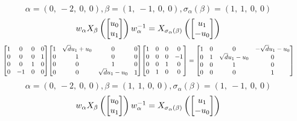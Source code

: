 \documentclass[11pt]{article}
\theoremstyle{definition}
\begin{document}
\[
\alpha = \left( 0, \  -2, \  0, \  0\right), \beta = \left( 1, \  -1, \  0, \  0\right), \sigma_{\alpha}(\beta) = \left( 1, \  1, \  0, \  0\right)
\]
\[
\scaletoalign{\textwidth}{w_{\alpha} X_{\beta}\left(\left[\begin{matrix}u_{0}\\u_{1}\end{matrix}\right]\right) w_{\alpha}^{-1} = X_{\sigma_{\alpha}\left(\beta\right)}\left(\left[\begin{matrix}u_{1}\\- u_{0}\end{matrix}\right]\right)}
\]
\[
\scaletoalign{\textwidth}{{\left[\begin{matrix}1 & 0 & 0 & 0\\0 & 0 & 0 & 1\\0 & 0 & 1 & 0\\0 & -1 & 0 & 0\end{matrix}\right]} {\left[\begin{matrix}1 & \sqrt{d} u_{1} + u_{0} & 0 & 0\\0 & 1 & 0 & 0\\0 & 0 & 1 & 0\\0 & 0 & \sqrt{d} u_{1} - u_{0} & 1\end{matrix}\right]} {\left[\begin{matrix}1 & 0 & 0 & 0\\0 & 0 & 0 & -1\\0 & 0 & 1 & 0\\0 & 1 & 0 & 0\end{matrix}\right]} = {\left[\begin{matrix}1 & 0 & 0 & - \sqrt{d} u_{1} - u_{0}\\0 & 1 & \sqrt{d} u_{1} - u_{0} & 0\\0 & 0 & 1 & 0\\0 & 0 & 0 & 1\end{matrix}\right]}}
\]
\[
\alpha = \left( 0, \  -2, \  0, \  0\right), \beta = \left( 1, \  1, \  0, \  0\right), \sigma_{\alpha}(\beta) = \left( 1, \  -1, \  0, \  0\right)
\]
\[
\scaletoalign{\textwidth}{w_{\alpha} X_{\beta}\left(\left[\begin{matrix}u_{0}\\u_{1}\end{matrix}\right]\right) w_{\alpha}^{-1} = X_{\sigma_{\alpha}\left(\beta\right)}\left(\left[\begin{matrix}u_{1}\\- u_{0}\end{matrix}\right]\right)}
\]
\end{document}
